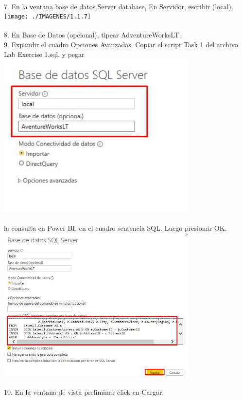 \documentclass[preprint,12pt]{elsarticle}
\begin{document}
\begin{itemize}
		 		\\ 7. En la ventana base de datos Server database, En Servidor, escribir (local).
		 	\\ \texttt{[image: ./IMAGENES/1.1.7]} \\
		 		\\ 8. En Base de Datos (opcional), tipear AdventureWorksLT.
		 		\\ 9. Expandir el cuadro Opciones Avanzadas. Copiar el script Task 1 del archivo \\ Lab Exercise 1.sql. y pegar
		 	\\ \includegraphics[width=10cm]{./IMAGENES/1.1.8} \\
		 		\\ la consulta en Power BI, en el cuadro sentencia SQL. Luego presionar OK.
		 		\\ \includegraphics[width=10cm]{./IMAGENES/1.1.9} \\
		 		\\ 10. En la ventana de vista preliminar click en Cargar.

\end{itemize}
\end{document}
